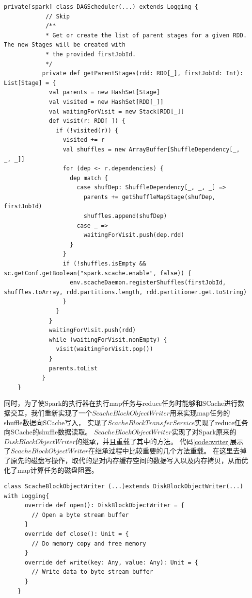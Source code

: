\begin{lstlisting}[style={myScalastyle}, caption={DAGScheduler代码片段}, label={code:dagScheduler}]
    private[spark] class DAGScheduler(...) extends Logging {
            // Skip
            /**
            * Get or create the list of parent stages for a given RDD.  The new Stages will be created with
            * the provided firstJobId.
            */
           private def getParentStages(rdd: RDD[_], firstJobId: Int): List[Stage] = {
             val parents = new HashSet[Stage]
             val visited = new HashSet[RDD[_]]
             val waitingForVisit = new Stack[RDD[_]]
             def visit(r: RDD[_]) {
               if (!visited(r)) {
                 visited += r
                 val shuffles = new ArrayBuffer[ShuffleDependency[_, _, _]]
                 for (dep <- r.dependencies) {
                   dep match {
                     case shufDep: ShuffleDependency[_, _, _] =>
                       parents += getShuffleMapStage(shufDep, firstJobId)
                       shuffles.append(shufDep)
                     case _ =>
                       waitingForVisit.push(dep.rdd)
                   }
                 }
                 if (!shuffles.isEmpty && sc.getConf.getBoolean("spark.scache.enable", false)) {
                   env.scacheDaemon.registerShuffles(firstJobId, shuffles.toArray, rdd.partitions.length, rdd.partitioner.get.toString)
                 }
               }
             }
             waitingForVisit.push(rdd)
             while (waitingForVisit.nonEmpty) {
               visit(waitingForVisit.pop())
             }
             parents.toList
           }
    }
\end{lstlisting}

同时，为了使Spark的执行器在执行map任务与reduce任务时能够和SCache进行数据交互，我们重新实现了一个$ScacheBlockObjectWriter$用来实现map任务的shuffle数据向SCache写入，
实现了$ScacheBlockTransferService$实现了reduce任务向SCache的shuffle数据读取。
$ScacheBlockObjectWriter$实现了对Spark原来的$DiskBlockObjectWriter$的继承，并且重载了其中的方法。
代码\ref{code:writer}展示了$ScacheBlockObjectWriter$在继承过程中比较重要的几个方法重载。
在这里去掉了原先的磁盘写操作，取代的是对内存缓存空间的数据写入以及内存拷贝，从而优化了map计算任务的磁盘阻塞。

\begin{lstlisting}[style={myScalastyle}, caption={ScacheBlockObjectWriter代码片段}, label={code:writer}]
    class ScacheBlockObjectWriter (...)extends DiskBlockObjectWriter(...) with Logging{
      override def open(): DiskBlockObjectWriter = {
        // Open a byte stream buffer
      }
      override def close(): Unit = {
        // Do memory copy and free memory
      }
      override def write(key: Any, value: Any): Unit = {
        // Write data to byte stream buffer
      }
    }
\end{lstlisting}

